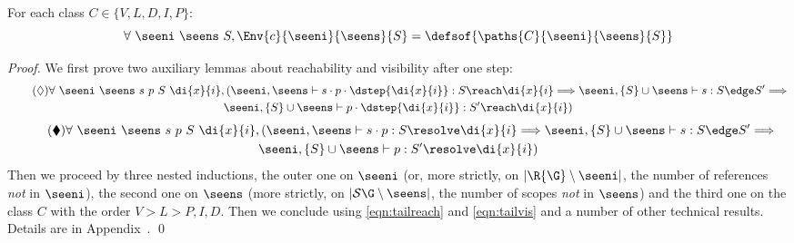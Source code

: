 \begin{lemma}
\label{lemma:pathset-alg}
For each class $C \in \{V,L,D,I,P\}$:\vspace*{-.3\baselineskip}
$$ \forall\ \seeni\ \seens\ S, \Env{c}{\seeni}{\seens}{S} = \defsof{\paths{C}{\seeni}{\seens}{S}}$$
\end{lemma}


\begin{proof} 
We first prove two auxiliary lemmas about reachability and visibility after one step:
\begin{multline}\label{eqn:tailreach}\tag{$\lozenge$}
   \forall\ \seeni\ \seens\ s\ p\ S\ \di{x}{i},
   (\seeni,\seens \vdash s \cdot p\cdot\dstep{\di{x}{i}} : S \reach \di{x}{i} \Longrightarrow
   \seeni,\{S\}\cup\seens \vdash s : S \edge S' \Longrightarrow\\ 
   \seeni,\{S\}\cup\seens \vdash p\cdot\dstep{\di{x}{i}} : S' \reach \di{x}{i})    
  \end{multline}\vspace*{-8mm}
\begin{multline}\label{eqn:tailvis}\tag{$\blacklozenge$}
  \forall\ \seeni\ \seens\ s\ p\ S\ \di{x}{i},
  (\seeni,\seens \vdash s \cdot p : S \resolve \di{x}{i} \Longrightarrow 
  \seeni,\{S\}\cup\seens \vdash s : S \edge S' \Longrightarrow\\ 
  \seeni,\{S\}\cup\seens \vdash p : S' \resolve \di{x}{i})  
\end{multline}
Then we proceed by three nested inductions, 
the outer one on $\seeni$ (or, more strictly, on \mbox{$|\R{\G} \setminus \seeni|$}, the number of references
\emph{not} in $\seeni$), the second one on $\seens$ (more strictly, on \mbox{$|\S{\G} \setminus \seens|$}, the number of 
scopes \emph{not} in $\seens$) and the third one on the class $C$ with the order $V > L > {P,I,D}$. Then we conclude using \ref{eqn:tailreach} and \ref{eqn:tailvis} and a number of other technical results. Details are in Appendix~. \qed
\end{proof}

